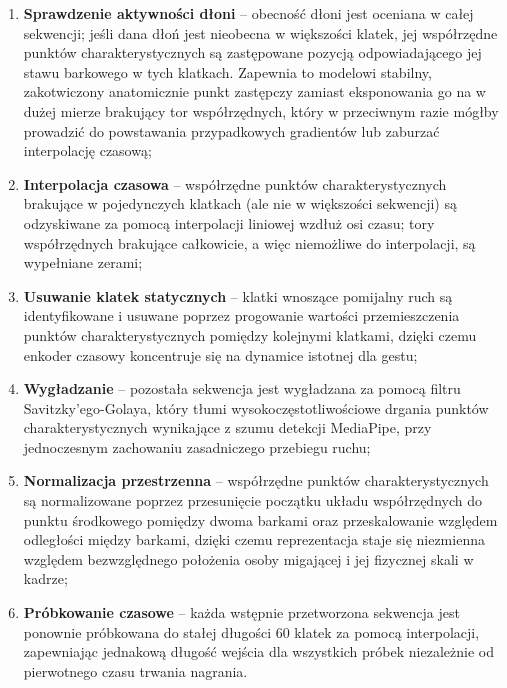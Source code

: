 \begin{enumerate}
  \item \textbf{Sprawdzenie aktywności dłoni} -- obecność dłoni jest oceniana
        w całej sekwencji; jeśli dana dłoń jest nieobecna w większości klatek,
        jej współrzędne punktów charakterystycznych są zastępowane pozycją
        odpowiadającego jej stawu barkowego w tych klatkach. Zapewnia to modelowi
        stabilny, zakotwiczony anatomicznie punkt zastępczy zamiast eksponowania
        go na w dużej mierze brakujący tor współrzędnych, który w przeciwnym
        razie mógłby prowadzić do powstawania przypadkowych gradientów lub
        zaburzać interpolację czasową;
  \item \textbf{Interpolacja czasowa} -- współrzędne punktów charakterystycznych
        brakujące w pojedynczych klatkach (ale nie w większości sekwencji) są
        odzyskiwane za pomocą interpolacji liniowej wzdłuż osi czasu; tory
        współrzędnych brakujące całkowicie, a więc niemożliwe do interpolacji,
        są wypełniane zerami;
  \item \textbf{Usuwanie klatek statycznych} -- klatki wnoszące pomijalny ruch
        są identyfikowane i usuwane poprzez progowanie wartości przemieszczenia
        punktów charakterystycznych pomiędzy kolejnymi klatkami, dzięki czemu
        enkoder czasowy koncentruje się na dynamice istotnej dla gestu;
  \item \textbf{Wygładzanie} -- pozostała sekwencja jest wygładzana za pomocą
        filtru Savitzky'ego-Golaya, który tłumi wysokoczęstotliwościowe drgania
        punktów charakterystycznych wynikające z szumu detekcji MediaPipe, przy
        jednoczesnym zachowaniu zasadniczego przebiegu ruchu;
  \item \textbf{Normalizacja przestrzenna} -- współrzędne punktów
        charakterystycznych są normalizowane poprzez przesunięcie początku
        układu współrzędnych do punktu środkowego pomiędzy dwoma barkami oraz
        przeskalowanie względem odległości między barkami, dzięki czemu
        reprezentacja staje się niezmienna względem bezwzględnego położenia
        osoby migającej i jej fizycznej skali w kadrze;
  \item \textbf{Próbkowanie czasowe} -- każda wstępnie przetworzona sekwencja
        jest ponownie próbkowana do stałej długości 60 klatek za pomocą
        interpolacji, zapewniając jednakową długość wejścia dla wszystkich
        próbek niezależnie od pierwotnego czasu trwania nagrania.
\end{enumerate}

